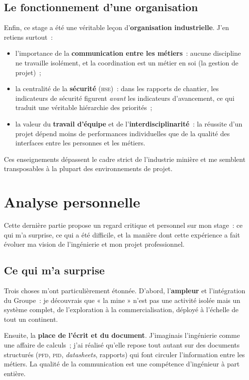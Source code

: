 \documentclass[12pt,a4paper,oneside]{report}
\newcommand{\sig}[1]{\textsc{#1}}
\begin{document}
\section{Le fonctionnement d'une organisation}

Enfin, ce stage a été une véritable leçon d'\textbf{organisation industrielle}. J'en retiens surtout~:

\begin{itemize}
\item l'importance de la \textbf{communication entre les métiers}~: aucune discipline ne travaille isolément, et la coordination est un métier en soi (la gestion de projet)~;
\item la centralité de la \textbf{sécurité} (\sig{hse})~: dans les rapports de chantier, les indicateurs de sécurité figurent \emph{avant} les indicateurs d'avancement, ce qui traduit une véritable hiérarchie des priorités~;
\item la valeur du \textbf{travail d'équipe} et de l'\textbf{interdisciplinarité}~: la réussite d'un projet dépend moins de performances individuelles que de la qualité des interfaces entre les personnes et les métiers.
\end{itemize}

Ces enseignements dépassent le cadre strict de l'industrie minière et me semblent transposables à la plupart des environnements de projet.
\chapter{Analyse personnelle}
\label{chap:analyse}

Cette dernière partie propose un regard critique et personnel sur mon stage~: ce qui m'a surprise, ce qui a été difficile, et la manière dont cette expérience a fait évoluer ma vision de l'ingénierie et mon projet professionnel.

\section{Ce qui m'a surprise}

Trois choses m'ont particulièrement étonnée. D'abord, l'\textbf{ampleur} et l'intégration du Groupe~: je découvrais que « la mine » n'est pas une activité isolée mais un système complet, de l'exploration à la commercialisation, déployé à l'échelle de tout un continent.

Ensuite, la \textbf{place de l'écrit et du document}. J'imaginais l'ingénierie comme une affaire de calculs~; j'ai réalisé qu'elle repose tout autant sur des documents structurés (\sig{pfd}, \sig{pid}, \textit{datasheets}, rapports) qui font circuler l'information entre les métiers. La qualité de la communication est une compétence d'ingénieur à part entière.
\end{document}
